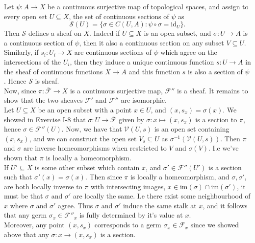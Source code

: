 \documentclass{article}
\theoremstyle{definition}
\newcommand{\im}{\text{im}}
\newcommand{\id}{\text{id}}
\begin{document}
Let $\psi : A \to X$ be a continuous surjective map of topological spaces, and
assign to every open set $U \subseteq X$, the set of continuous sections of
$\psi$ as
\[
	\mathscr{S}(U)
	=
	\{
		\sigma \in C(U, A)
		:
		\psi \circ \sigma = \id_U
	\}.
\]
Then $\mathscr{S}$ defines a sheaf on $X$. Indeed if $U \subseteq X$ is an open
subset, and $\sigma : U \to A$ is a continuous section of $\psi$, then it also
a continuous section on any subset $V \subseteq U$. Similarly, if $s_i : U_i
\to X$ are continuous sections of $\psi$ which agree on the intersections of
the $U_i$, then they induce a unique continuous function $s : U \to A$ in the
sheaf of continuous functions $X \to A$ and this function $s$ is also a section
of $\psi$. Hence $\mathscr{S}$ is sheaf. \\

Now, since $\pi : \overline{\mathscr{F}} \to X$ is a continuous surjective map,
$\mathscr{F}''$ is a sheaf. It remains to show that the two sheaves $\mathscr{F}'$
and $\mathscr{F}''$ are isomorphic. \\

Let $U \subseteq X$ be an open subset with a point $x \in U$, and $(x, s_x) =
\sigma(x)$. We showed in Exercise I-8 that $\sigma : U \to
\overline{\mathscr{F}}$ given by $\sigma : x \mapsto (x, s_x)$ is a section to
$\pi$, hence $\sigma \in \mathscr{F}''(U)$. Now, we have that $\mathscr{V}(U,
s)$ is an open set containing $(x, s_x)$, and we can construct the open set
$V_s \subseteq U$ as $\sigma^{-1}(\mathscr{V}(U, s))$. Then $\pi$ and $\sigma$
are inverse homeomorphisms when restricted to $V$ and $\sigma(V)$. I.e we've
shown that $\pi$ is locally a homeomorphism. \\

If $U' \subseteq X$ is some other subset which contain $x$, and $\sigma' \in
\mathscr{F}''(U')$ is a section such that $\sigma'(x) = \sigma(x)$. Then since
$\pi$ is locally a homeomorphism, and $\sigma, \sigma'$, are both locally
inverse to $\pi$ with intersecting images, $x \in \im(\sigma) \cap
\im(\sigma')$, it must be that $\sigma$ and $\sigma'$ are locally the same. I.e
there exist some neighbourhood of $x$ where $\sigma$ and $\sigma'$ agree. Thus
$\sigma$ and $\sigma'$ induce the same stalk at $x$, and it follows that any
germ $\sigma_x \in \mathscr{F}''_x$ is fully determined by it's value at $x$.
\\

Moreover, any point $(x, s_x)$ corresponds to a germ $\sigma_x \in \mathscr{F}_x$
since we showed above that any $\sigma : x \to (x, s_x)$ is a section. \\
\end{document}
